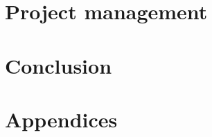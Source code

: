 \documentclass{article}
\begin{document}
\section{Project management}

\section{Conclusion}
\label{sec:conclusion}


\newpage
\nocite{*}
\printbibliography[heading=bibintoc]

\newpage
\section{Appendices}
\label{sec:appendix}

\end{document}
